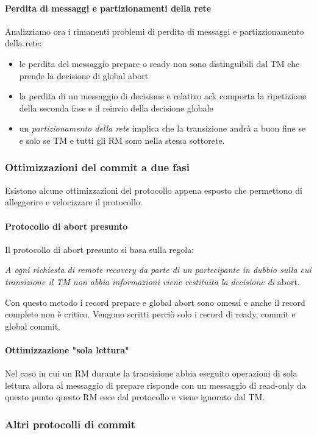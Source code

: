 \paragraph{Perdita di messaggi e partizionamenti della rete}
Analizziamo ora i rimanenti problemi di perdita di messaggi e partizzionamento della rete:
\begin{itemize}
\item le perdita del messaggio \textsf{prepare} o \textsf{ready} non sono distinguibili dal TM che prende la decisione di \textsf{global abort}
\item la perdita di un messaggio di decisione e relativo ack comporta la ripetizione della seconda fase e il reinvio della decisione globale
\item un \emph{partizionamento della rete} implica che la transizione andrà a buon fine se e solo se TM e tutti gli RM sono nella stessa sottorete.
\end{itemize}
\subsubsection{Ottimizzazioni del commit a due fasi}
Esistono alcune ottimizzazioni del protocollo appena esposto che permettono di alleggerire e velocizzare il protocollo.
\paragraph{Protocollo di abort presunto} Il protocollo di abort presunto si basa sulla regola:
\begin{center}
\emph{A ogni richiesta di remote recovery da parte di un partecipante in dubbio sulla cui transizione il TM non abbia informazioni viene restituita la decisione di} \textsf{abort}.
\end{center}
Con questo metodo i record \textsf{prepare} e \textsf{global abort} sono omessi e anche il record \textsf{complete} non è critico. Vengono scritti perciò solo i record di \textsf{ready, commit} e \textsf{global commit}.
\paragraph{Ottimizzazione "sola lettura"} Nel caso in cui un RM durante la transizione abbia eseguito operazioni di sola lettura allora al messaggio di prepare risponde con un messaggio di \textsf{read-only} da questo punto questo RM esce dal protocollo e viene ignorato dal TM.
\subsubsection{Altri protocolli di commit}
